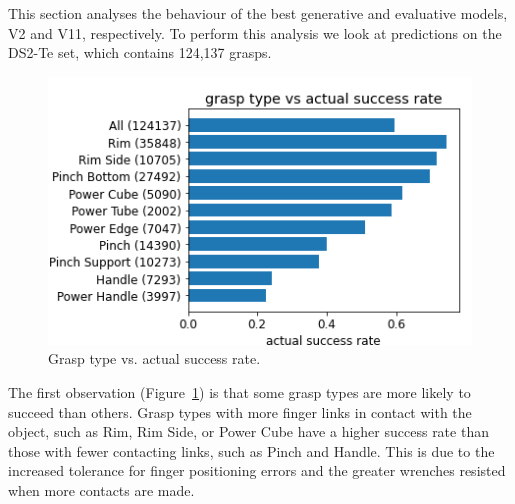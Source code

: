 
\noindent
This section analyses the behaviour of the best generative and evaluative models, V2 and V11, respectively. To perform this analysis we look at predictions on the DS2-Te set, which contains 124,137 grasps. %
\begin{figure}[h]
\centering 
\includegraphics[width=0.5\columnwidth]{images/post-analysis/Grasp_type_vs_success_prob.png}
\caption{Grasp type vs. actual success rate.}
\label{fig:post2}
\end{figure}

The first observation (Figure~\ref{fig:post2}) is that some grasp types are more likely to succeed than others. Grasp types with more finger links in contact with the object, such as Rim, Rim Side, or Power Cube have a higher success rate than those with fewer contacting links, such as Pinch and Handle.  This is due to the increased tolerance for finger positioning errors and the greater wrenches resisted when more contacts are made. 

